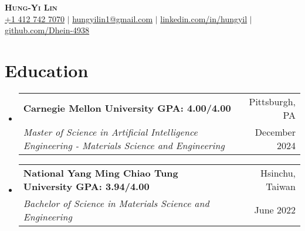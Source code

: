 \documentclass[a4paper,11pt]{article}
\makeatletter
\newcommand{\resumeItem}[1]{
  \item\small{
    {#1 \vspace{-2pt}}
  }
}
\newcommand{\resumeDoubleHeading}[4]{
  \vspace{-2pt}\item
    \begin{tabular*}{0.97\textwidth}[t]{l@{\extracolsep{\fill}}r}
        \textbf{#1} & #2 \\
        \textit{\small#3} & {\small #4} \\
    \end{tabular*}\vspace{-5pt}
}
\newcommand{\resumeSubHeadingListStart}{\begin{itemize}[leftmargin=0.15in, label={}]}
\newcommand{\resumeSubHeadingListEnd}{\end{itemize}}
\makeatother
\begin{document}

\begin{center}
    \textbf{\Huge \scshape Hung-Yi Lin} \\ \vspace{3pt}
    \small
    \faMobile \hspace{.5pt} \href{tel:14127427070}{+1 412 742 7070}
    $|$
    \faAt \hspace{.5pt} \href{mailto:hungyilin1@gmail.com}{hungyilin1@gmail.com}
    $|$
    \faLinkedinSquare \hspace{.5pt} \href{https://www.linkedin.com/in/hungyil}{linkedin.com/in/hungyil}
    $|$
    \faGithub \hspace{.5pt} \href{https://github.com/Dhein-4938}{github.com/Dhein-4938}
\end{center}



\section{Education}
\vspace{3pt}
\resumeSubHeadingListStart
    \resumeDoubleHeading
      {Carnegie Mellon University \textnormal{\small GPA: 4.00/4.00}}{Pittsburgh, PA}
      {Master of Science in Artificial Intelligence Engineering - Materials Science and Engineering}{December 2024}
    \resumeDoubleHeading
      {National Yang Ming Chiao Tung University  \textnormal{\small GPA: 3.94/4.00}}{Hsinchu, Taiwan}
      {Bachelor of Science in Materials Science and Engineering}{June 2022}
\resumeSubHeadingListEnd

\end{document}
